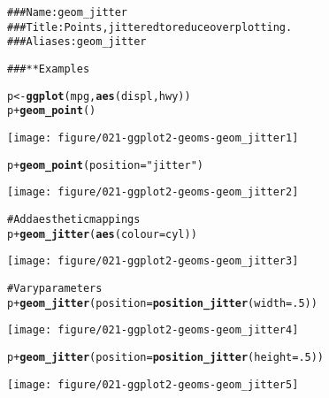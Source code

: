 \documentclass[a4paper,titlepage]{tufte-handout}\usepackage{graphicx, color}
\makeatletter
\def\maxwidth{ %
  \ifdim\Gin@nat@width>\linewidth
    \linewidth
  \else
    \Gin@nat@width
  \fi
}
\newcommand{\hlfunctioncall}[1]{\textcolor[rgb]{0.501960784313725,0,0.329411764705882}{\textbf{#1}}}%
\newcommand{\hlstring}[1]{\textcolor[rgb]{0.6,0.6,1}{#1}}%
\newcommand{\hlcomment}[1]{\textcolor[rgb]{0.180392156862745,0.6,0.341176470588235}{#1}}%
\newenvironment{kframe}{%
 \def\at@end@of@kframe{}%
 \ifinner\ifhmode%
  \def\at@end@of@kframe{\end{minipage}}%
  \begin{minipage}{\columnwidth}%
 \fi\fi%
 \def\FrameCommand##1{\hskip\@totalleftmargin \hskip-\fboxsep
 \colorbox{shadecolor}{##1}\hskip-\fboxsep
     \hskip-\linewidth \hskip-\@totalleftmargin \hskip\columnwidth}%
 \MakeFramed {\advance\hsize-\width
   \@totalleftmargin\z@ \linewidth\hsize
   \@setminipage}}%
 {\par\unskip\endMakeFramed%
 \at@end@of@kframe}
\newenvironment{knitrout}{}{} %
\makeatother
\begin{document}
\begin{knitrout}
\color{fgcolor}\begin{kframe}
\begin{alltt}
\hlcomment{### Name: geom_jitter}
\hlcomment{### Title: Points, jittered to reduce overplotting.}
\hlcomment{### Aliases: geom_jitter}

\hlcomment{### ** Examples}

p <- \hlfunctioncall{ggplot}(mpg, \hlfunctioncall{aes}(displ, hwy))
p + \hlfunctioncall{geom_point}()
\end{alltt}
\end{kframe}
\texttt{[image: figure/021-ggplot2-geoms-geom\_jitter1]} 
\begin{kframe}\begin{alltt}
p + \hlfunctioncall{geom_point}(position = \hlstring{"jitter"})
\end{alltt}
\end{kframe}
\texttt{[image: figure/021-ggplot2-geoms-geom\_jitter2]} 
\begin{kframe}\begin{alltt}

\hlcomment{# Add aesthetic mappings}
p + \hlfunctioncall{geom_jitter}(\hlfunctioncall{aes}(colour = cyl))
\end{alltt}
\end{kframe}
\texttt{[image: figure/021-ggplot2-geoms-geom\_jitter3]} 
\begin{kframe}\begin{alltt}

\hlcomment{# Vary parameters}
p + \hlfunctioncall{geom_jitter}(position = \hlfunctioncall{position_jitter}(width = .5))
\end{alltt}
\end{kframe}
\texttt{[image: figure/021-ggplot2-geoms-geom\_jitter4]} 
\begin{kframe}\begin{alltt}
p + \hlfunctioncall{geom_jitter}(position = \hlfunctioncall{position_jitter}(height = .5))
\end{alltt}
\end{kframe}
\texttt{[image: figure/021-ggplot2-geoms-geom\_jitter5]} 
\begin{kframe}\begin{alltt}


\end{alltt}
\end{kframe}
\end{knitrout}
\end{document}
